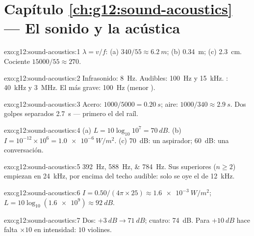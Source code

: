 \section*{Capítulo \ref{ch:g12:sound-acoustics} --- El sonido y la acústica}

\begin{solution}{exo:g12:sound-acoustics:1}
$\lambda = v/f$: (a) $340/55 \approx \qty{6.2}{m}$; (b) \qty{0.34}{m};
(c) \qty{2.3}{cm}. Cociente $15000/55 \approx 270$.
\end{solution}

\begin{solution}{exo:g12:sound-acoustics:2}
Infrasonido: \qty{8}{Hz}. Audibles: \qty{100}{Hz} y \qty{15}{kHz}.
: \qty{40}{kHz} y \qty{3}{MHz}. El más grave:
\qty{100}{Hz} (menor ).
\end{solution}

\begin{solution}{exo:g12:sound-acoustics:3}
Acero: $1000/5000 = \qty{0.20}{s}$; aire:
$1000/340 \approx \qty{2.9}{s}$. Dos golpes separados \qty{2.7}{s} ---
primero el del raíl.
\end{solution}

\begin{solution}{exo:g12:sound-acoustics:4}
(a) $L = 10\log_{10}10^{7} = \qty{70}{dB}$. (b)
$I = 10^{-12} \times 10^{6} = \qty{1.0e-6}{W/m^2}$. (c) \qty{70}{dB}:
un aspirador; \qty{60}{dB}: una conversación.
\end{solution}

\begin{solution}{exo:g12:sound-acoustics:5}
\qtylist{392;588;784}{Hz}. Sus  superiores ($n \ge 2$)
empiezan en \qty{24}{kHz}, por encima del techo audible: solo se oye el
 de \qty{12}{kHz}.
\end{solution}

\begin{solution}{exo:g12:sound-acoustics:6}
$I = 0.50/(4\pi \times 25) \approx \qty{1.6e-3}{W/m^2}$;
$L = 10\log_{10}(\num{1.6e9}) \approx \qty{92}{dB}$.
\end{solution}

\begin{solution}{exo:g12:sound-acoustics:7}
Dos: $+\qty{3}{dB} \to \qty{71}{dB}$; cuatro: \qty{74}{dB}. Para
$+\qty{10}{dB}$ hace falta $\times 10$ en intensidad: $10$ violines.
\end{solution}

